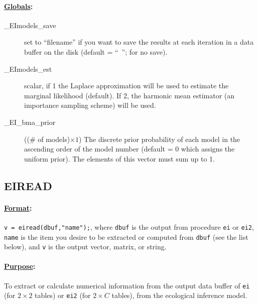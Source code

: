 \documentclass[11pt,titlepage]{article}
\begin{document}
\paragraph{\underline{Globals}:}
\begin{description}

\item[\_EImodels\_save] set to ``filename'' if you want to save the
  results at each iteration in a data buffer on the disk (default =
  ``\mbox{ }''; for no save).
  
\item[\_EImodels\_est] scalar, if 1 the Laplace approximation will be
  used to estimate the marginal likelihood (default). If 2, the
  harmonic mean estimator (an importance sampling scheme) will be
  used.
  
\item[\_EI\_bma\_prior] (($\#$ of models)$\times 1$) The discrete
  prior probability of each model in the ascending order of the model
  number (default = 0 which assigns the uniform prior). The elements
  of this vector must sum up to 1.
\end{description}


\subsection{EIREAD} \label{eiread}

\paragraph{\underline{Format}:} \texttt{v = eiread(dbuf,"name");}, where
\texttt{dbuf} is the output from procedure \texttt{ei} or
\texttt{ei2}, \texttt{name} is the item you desire to be extracted or
computed from \texttt{dbuf} (see the list below), and \texttt{v} is
the output vector, matrix, or string.

\paragraph{\underline{Purpose}:}
To extract or calculate numerical information from the output data
buffer of \texttt{ei} (for $2\times 2$ tables) or \texttt{ei2} (for
$2\times C$ tables), from the ecological inference model.
\end{document}
